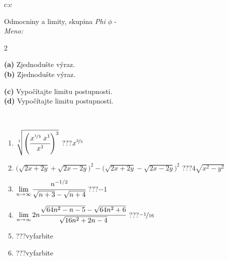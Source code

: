 \documentclass[10pt]{report}
\begin{document}
\begin{tabular}{c:c}
\begin{minipage}[c][104.5mm][t]{0.5\linewidth}
\begin{center}
\vspace{7mm}
{\huge Odmocniny a limity, skupina \textit{Phi $\phi$} -}\\[5mm]
\textit{Meno:}\phantom{xxxxxxxxxxxxxxxxxxxxxxxxxxxxxxxxxxxxxxxxxxxxxxxxxxxxxxxxxxxxxxxxx}\\[5mm]
\begin{minipage}{0.95\linewidth}
\begin{center}
{\small \begin{multicols}{2} \raggedright
\textbf{(a)} Zjednodušte výraz. \\[1mm]
\textbf{(b)} Zjednodušte výraz. \par \columnbreak
\textbf{(c)} Vypočítajte limitu postupnosti. \\[1mm]
\textbf{(d)} Vypočítajte limitu postupnosti.
\end{multicols}
}
\end{center}
\end{minipage}
\\[4mm]
\begin{minipage}{0.79\linewidth}
\begin{center}
\begin{varwidth}{\linewidth}
\begin{enumerate}
\small
\item $\sqrt[1]{\left(\cfrac{x^{\nicefrac{1}{5}}\;x^{1}}{x^{1}}\right)^{3}}$\quad \dotfill\; ???\;\dotfill \quad $x^{\nicefrac{3}{5}}$
\item {\footnotesize{\scriptsize$\big(\sqrt{2x+2y}+\sqrt{2x-2y}\big)^2-\big(\sqrt{2x+2y}-\sqrt{2x-2y}\big)^2$}\quad \dotfill\; ???\;\dotfill \quad $4\sqrt{x^2-y^2}$}
\item $\lim\limits_{n\to\infty}\cfrac{n^{-1/2}}{\sqrt{n+3}-\sqrt{n+4}}$\quad \dotfill\; ???\;\dotfill \quad $-1$
\item $\lim\limits_{n\to\infty}2n\cfrac{\sqrt{64n^2-n-5}-\sqrt{64n^2+6}}{\sqrt{16n^2+2n-4}}$\quad \dotfill\; ???\;\dotfill \quad $\nicefrac{-1}{16}$
\item \quad \dotfill\; ???\;\dotfill \quad vyfarbite
\item \quad \dotfill\; ???\;\dotfill \quad vyfarbite
\end{enumerate}
\end{varwidth}
\end{center}
\end{minipage}

\end{center}
\end{minipage}
\end{tabular}
\end{document}
